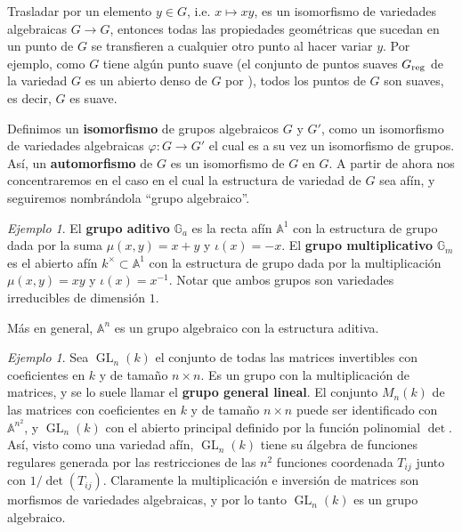 \documentclass[spanish,10pt]{amsart}
\theoremstyle{definition}
\theoremstyle{remark}
\newtheorem{example}[theorem]{Ejemplo}
\numberwithin{equation}{section}
\newcommand{\afine}[1]{\mathbb{A}^{#1}}
\begin{document}
Trasladar por un elemento $y \in G$, i.e. $x \mapsto x y$, es un isomorfismo de variedades algebraicas $G \to G$, entonces todas las propiedades geométricas que sucedan en un punto de $G$ se transfieren a cualquier otro punto al hacer variar $y$. Por ejemplo, como $G$ tiene algún punto suave (el conjunto de puntos suaves $G_{\textup{reg}}$ de la variedad $G$ es un abierto denso de $G$ por \cite[Teorema 2.13.12]{notas_pedro}), todos los puntos de $G$ son suaves, es decir, $G$ es suave.

Definimos un \textbf{isomorfismo} de grupos algebraicos $G$ y $G'$, como un isomorfismo de variedades algebraicas $\varphi : G \to G'$ el cual es a su vez un isomorfismo de grupos. Así, un \textbf{automorfismo} de $G$ es un isomorfismo de $G$ en $G$. A partir de ahora nos concentraremos en el caso en el cual la estructura de variedad de $G$ sea afín, y seguiremos nombrándola ``grupo algebraico''.

\begin{example}
El \textbf{grupo aditivo} $\mathbb{G}_a$ es la recta afín $\afine 1$ con la estructura de grupo dada por la suma $\mu (x,y) = x + y$ y $\iota (x) = -x$. El \textbf{grupo multiplicativo} $\mathbb{G}_m$ es el abierto afín $k^\times \subset \afine 1$ con la estructura de grupo dada por la multiplicación $\mu (x,y) = xy$ y $\iota (x) = x^{-1}$. Notar que ambos grupos son variedades irreducibles de dimensión $1$.

Más en general, $\afine n$ es un grupo algebraico con la estructura aditiva.
\end{example}

\begin{example}
Sea $\operatorname{GL}_n (k)$ el conjunto de todas las matrices invertibles con coeficientes en $k$ y de tamaño $n \times n$. Es un grupo con la multiplicación de matrices, y se lo suele llamar el \textbf{grupo general lineal}. El conjunto $M_n (k)$ de las matrices con coeficientes en $k$ y de tamaño $n \times n$ puede ser identificado con $\afine {n^2}$, y $\operatorname{GL}_n (k)$ con el abierto principal definido por la función polinomial $\det$. Así, visto como una variedad afín, $\operatorname{GL}_n (k)$ tiene su álgebra de funciones regulares generada por las restricciones de las $n^2$ funciones coordenada $T_{ij}$ junto con $1 / \det (T_{ij})$. Claramente la multiplicación e inversión de matrices son morfismos de variedades algebraicas, y por lo tanto $\operatorname{GL}_n (k)$ es un grupo algebraico.
\end{example}
\end{document}
